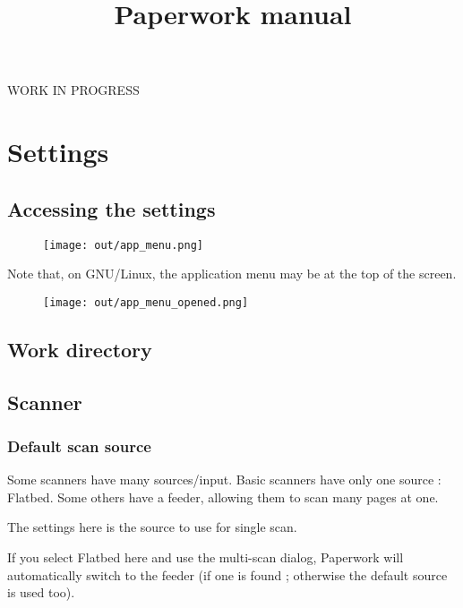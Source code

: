 \documentclass[10pt,a4paper]{article}
\date{}
\title{Paperwork manual}
\begin{document}
\maketitle

WORK IN PROGRESS

\pagebreak

\tableofcontents

\pagebreak

\section{Settings}

\subsection{Accessing the settings}

\begin{figure}[H]
\texttt{[image: out/app\_menu.png]}
\end{figure}

Note that, on GNU/Linux, the application menu may be at the top of
the screen.

\begin{figure}[H]
\texttt{[image: out/app\_menu\_opened.png]}
\end{figure}


\subsection{Work directory}

\subsection{Scanner}

\subsubsection{Default scan source}

Some scanners have many sources/input. Basic scanners have only one
source : Flatbed. Some others have a feeder, allowing them to scan
many pages at one.

The settings here is the source to use for single scan.

If you select Flatbed here and use the
multi-scan dialog, Paperwork will
automatically switch to the feeder (if one is found ; otherwise the
default source is used too).
\end{document}
